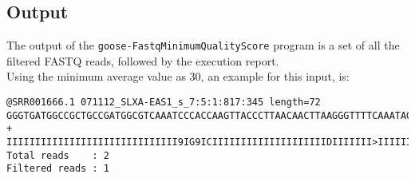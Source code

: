 \subsection*{Output}
The output of the \texttt{goose-FastqMinimumQualityScore} program is a set of all the filtered FASTQ reads, followed by the execution report.\\
Using the minimum average value as 30, an example for this input, is:
\begin{lstlisting}
@SRR001666.1 071112_SLXA-EAS1_s_7:5:1:817:345 length=72
GGGTGATGGCCGCTGCCGATGGCGTCAAATCCCACCAAGTTACCCTTAACAACTTAAGGGTTTTCAAATAGA
+
IIIIIIIIIIIIIIIIIIIIIIIIIIIIII9IG9ICIIIIIIIIIIIIIIIIIIIIDIIIIIII>IIIIII/
Total reads    : 2
Filtered reads : 1
\end{lstlisting}
